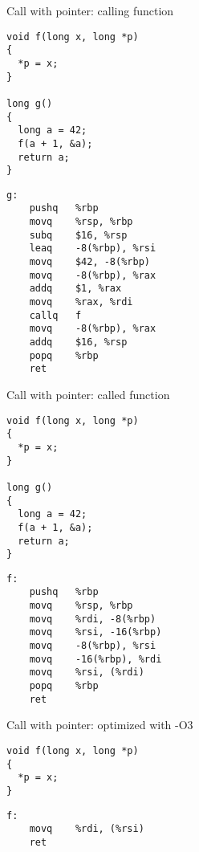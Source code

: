 \documentclass[landscape]{beamer}
\begin{document}
\begin{frame}[fragile]{Call with pointer: calling function}
\begin{minipage}{.5\textwidth}
\begin{verbatim}
void f(long x, long *p)
{
  *p = x;
}

long g()
{
  long a = 42;
  f(a + 1, &a);
  return a;
}
\end{verbatim}
\end{minipage}
%
\begin{minipage}{.4\textwidth}
\begin{verbatim}
g:                                
	pushq	%rbp
	movq	%rsp, %rbp
	subq	$16, %rsp
	leaq	-8(%rbp), %rsi
	movq	$42, -8(%rbp)
	movq	-8(%rbp), %rax
	addq	$1, %rax
	movq	%rax, %rdi
	callq	f
	movq	-8(%rbp), %rax
	addq	$16, %rsp
	popq	%rbp
	ret
\end{verbatim}
\end{minipage}
\end{frame}



\begin{frame}[fragile]{Call with pointer: called function}
\begin{minipage}{.5\textwidth}
\begin{verbatim}
void f(long x, long *p)
{
  *p = x;
}

long g()
{
  long a = 42;
  f(a + 1, &a);
  return a;
}
\end{verbatim}
\end{minipage}
%
\begin{minipage}{.4\textwidth}
\begin{verbatim}
f:  
	pushq	%rbp
	movq	%rsp, %rbp
	movq	%rdi, -8(%rbp)
	movq	%rsi, -16(%rbp)
	movq	-8(%rbp), %rsi
	movq	-16(%rbp), %rdi
	movq	%rsi, (%rdi)
	popq	%rbp
	ret
\end{verbatim}
\end{minipage}
\end{frame}

\begin{frame}[fragile]{Call with pointer: optimized with -O3}
\begin{minipage}{.5\textwidth}
\begin{verbatim}
void f(long x, long *p)
{
  *p = x;
}

\end{verbatim}
\end{minipage}
%
\begin{minipage}{.4\textwidth}
\begin{verbatim}
f:  
	movq	%rdi, (%rsi)
	ret
\end{verbatim}
\end{minipage}
\end{frame}
\end{document}
